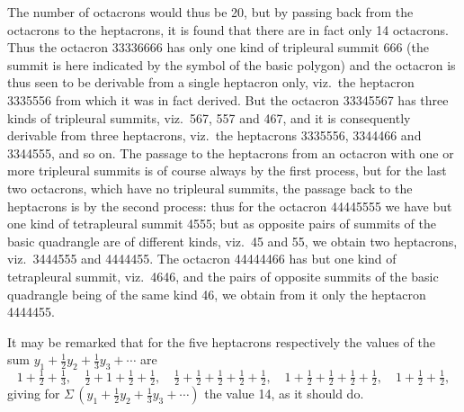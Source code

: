 \documentclass[11pt,a4paper]{article}
\begin{document}
The number of octacrons would thus be 20, but by passing back from the octacrons to the heptacrons, it is found that there are in fact only 14 octacrons. Thus the octacron 33336666 has only one kind of tripleural summit 666 (the summit is here indicated by the symbol of the basic polygon) and the octacron is thus seen to be derivable from a single heptacron only, viz.\ the heptacron 3335556 from which it was in fact derived. But the octacron 33345567 has three kinds of tripleural summits, viz.\ 567, 557 and 467, and it is consequently derivable from three heptacrons, viz.\ the heptacrons 3335556, 3344466 and 3344555, and so on. The passage to the heptacrons from an octacron with one or more tripleural summits is of course always by the first process, but for the last two octacrons, which have no tripleural summits, the passage back to the heptacrons is by the second process: thus for the octacron 44445555 we have but one kind of tetrapleural summit 4555; but as opposite pairs of summits of the basic quadrangle are of different kinds, viz.\ 45 and 55, we obtain two heptacrons, viz.\ 3444555 and 4444455. The octacron 44444466 has but one kind of tetrapleural summit, viz.\ 4646, and the pairs of opposite summits of the basic quadrangle being of the same kind 46, we obtain from it only the heptacron 4444455.

It may be remarked that for the five heptacrons respectively the values of the sum $y_1+\tfrac{1}{2}y_2+\tfrac{1}{3}y_3+\cdots$ are
\[
1+\tfrac{1}{2}+\tfrac{1}{3},\quad \tfrac{1}{2}+1+\tfrac{1}{2}+\tfrac{1}{2},\quad \tfrac{1}{2}+\tfrac{1}{2}+\tfrac{1}{2}+\tfrac{1}{2}+\tfrac{1}{2},\quad 1+\tfrac{1}{2}+\tfrac{1}{2}+\tfrac{1}{2}+\tfrac{1}{2},\quad 1+\tfrac{1}{2}+\tfrac{1}{2},
\]
giving for $\Sigma\,(y_1+\tfrac{1}{2}y_2+\tfrac{1}{3}y_3+\cdots)$ the value 14, as it should do.

\medskip

\noindent\par\noindent{}\par
\end{document}
